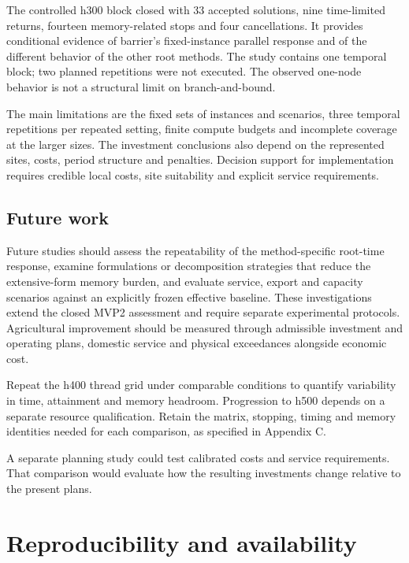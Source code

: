 \documentclass[
  english,
  11pt,
  a4paper,
  authoryear,
  preprint]{elsarticle}
\begin{document}
The controlled h300 block closed with 33 accepted solutions, nine time-limited returns, fourteen memory-related stops and four cancellations. It provides conditional evidence of barrier's fixed-instance parallel response and of the different behavior of the other root methods. The study contains one temporal block; two planned repetitions were not executed. The observed one-node behavior is not a structural limit on branch-and-bound.

The main limitations are the fixed sets of instances and scenarios,
three temporal repetitions per repeated setting, finite compute budgets
and incomplete coverage at the larger sizes. The investment conclusions
also depend on the represented sites, costs, period structure and
penalties. Decision support for implementation requires credible local
costs, site suitability and explicit service requirements.

\subsection{Future work}\label{future-work}

Future studies should assess the repeatability of the method-specific root-time response, examine formulations or decomposition strategies that reduce the extensive-form memory burden, and evaluate service, export and capacity scenarios against an explicitly frozen effective baseline. These investigations extend the closed MVP2 assessment and require separate experimental protocols. Agricultural improvement should be measured through admissible investment and operating plans, domestic service and physical exceedances alongside economic cost.


Repeat the h400 thread grid under comparable conditions to quantify
variability in time, attainment and memory headroom. Progression to h500
depends on a separate resource qualification. Retain the matrix,
stopping, timing and memory identities needed for each comparison, as
specified in Appendix C.

A separate planning study could test calibrated costs and service
requirements. That comparison would evaluate how the resulting
investments change relative to the present plans.

\section{Reproducibility and
availability}\label{reproducibility-and-availability}
\end{document}
